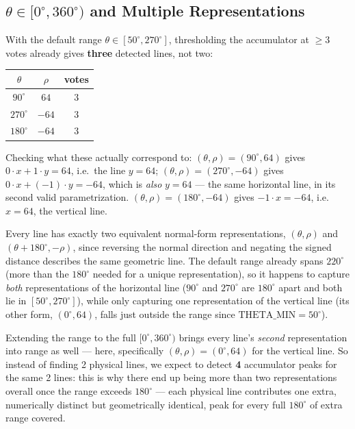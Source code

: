 \documentclass[11pt]{article}
\begin{document}
\subsection{$\theta\in[0^\circ,360^\circ)$ and Multiple Representations}

With the default range $\theta\in[50^\circ,270^\circ]$, thresholding the accumulator at
$\geq 3$ votes already gives \textbf{three} detected lines, not two:

\begin{center}
\begin{tabular}{ccc}
\toprule
$\theta$ & $\rho$ & votes \\
\midrule
$90^\circ$ & $64$ & 3 \\
$270^\circ$ & $-64$ & 3 \\
$180^\circ$ & $-64$ & 3 \\
\bottomrule
\end{tabular}
\end{center}

Checking what these actually correspond to: $(\theta,\rho)=(90^\circ,64)$ gives
$0\cdot x + 1\cdot y = 64$, i.e.\ the line $y=64$; $(\theta,\rho)=(270^\circ,-64)$ gives
$0\cdot x + (-1)\cdot y = -64$, which is \emph{also} $y=64$ --- the same horizontal line, in
its second valid parametrization. $(\theta,\rho)=(180^\circ,-64)$ gives $-1\cdot x = -64$,
i.e.\ $x=64$, the vertical line.

Every line has exactly two equivalent normal-form representations, $(\theta,\rho)$ and
$(\theta+180^\circ,-\rho)$, since reversing the normal direction and negating the signed
distance describes the same geometric line. The default range already spans $220^\circ$
(more than the $180^\circ$ needed for a unique representation), so it happens to capture
\emph{both} representations of the horizontal line ($90^\circ$ and $270^\circ$ are
$180^\circ$ apart and both lie in $[50^\circ,270^\circ]$), while only capturing one
representation of the vertical line (its other form, $(0^\circ,64)$, falls just outside the
range since $\mathrm{THETA\_MIN}=50^\circ$).

Extending the range to the full $[0^\circ,360^\circ)$ brings every line's \emph{second}
representation into range as well --- here, specifically $(\theta,\rho)=(0^\circ,64)$ for
the vertical line. So instead of finding 2 physical lines, we expect to detect
\textbf{4} accumulator peaks for the same 2 lines: this is why there end up being more than
two representations overall once the range exceeds $180^\circ$ --- each physical line
contributes one extra, numerically distinct but geometrically identical, peak for every
full $180^\circ$ of extra range covered.
\end{document}
